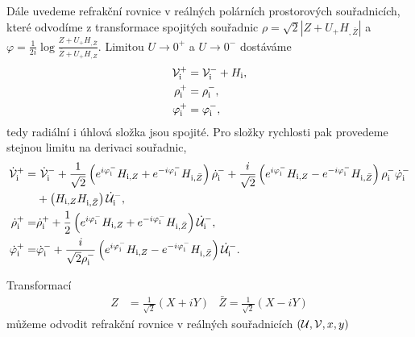 Dále uvedeme refrakční rovnice v reálných polárních prostorových souřadnicích, které odvodíme z transformace spojitých souřadnic
$\rho = \sqrt{2} \left|Z + U_{+} H_{,\bar{Z}}\right|$ a $\varphi = \frac{1}{2i} \log \frac{Z + U_+ H_{,\bar{Z}}}{\bar{Z} + U_+ H_{,Z}}$.
Limitou $U \to 0^+$ a $U \to 0^-$ dostáváme
\begin{equation}
    \begin{split}
        \mathcal{V}^{+}_{\mathrm{i}} &= \mathcal{V}^{-}_{\mathrm{i}} + H_{\mathrm{i}},\\
        \rho^{+}_{\mathrm{i}} &= \rho^{-}_{\mathrm{i}},\\
        \varphi^{+}_{\mathrm{i}} &= \varphi^{-}_{\mathrm{i}},
    \end{split}
\end{equation}
tedy radiální i úhlová složka jsou spojité. Pro složky rychlosti pak provedeme stejnou limitu na derivaci souřadnic,
\begin{equation}
    \begin{split}
        \dot{\mathcal{V}}_{\mathrm{i}}^{+}=& ~\dot{\mathcal{V}}_{\mathrm{i}}^{-}+\frac{1}{\sqrt{2}}\left(e^{i \varphi_{\mathrm{i}}^{-}} H_{\mathrm{i}, Z}+e^{-i \varphi_{\mathrm{i}}^{-}} H_{\mathrm{i}, \bar{Z}}\right) \dot{\rho}_{\mathrm{i}}^{-}+\frac{i}{\sqrt{2}}\left(e^{i \varphi_{\mathrm{i}}^{-}} H_{\mathrm{i}, Z}-e^{-i \varphi_{\mathrm{i}}^{-}} H_{\mathrm{i}, \bar{Z}}\right) \rho_{\mathrm{i}}^{-} \dot{\varphi}_{\mathrm{i}}^{-} \\
        &+\left(H_{\mathrm{i}, Z} H_{\mathrm{i}, \bar{Z}}\right) \dot{\mathcal{U}}_{\mathrm{i}}^{-}, \\
        \dot{\rho}_{\mathrm{i}}^{+}=& \dot{\rho}_{\mathrm{i}}^{+} + \frac{1}{2} \left(e^{i \varphi^-_\mathrm{i}} H_{\mathrm{i},Z} + e^{-i \varphi^-_\mathrm{i}} H_{\mathrm{i},\bar{Z}}\right)\dot{\mathcal{U}}_\mathrm{i}^{-},\\
        \dot{\varphi}_{\mathrm{i}}^{+}=&\dot{\varphi}_{\mathrm{i}}^{-} + \frac{i}{\sqrt{2}\rho_{\mathrm{i}}^{-}} \left(e^{i \varphi_{\mathrm{i}}^{-}} H_{\mathrm{i}, Z} - e^{-i \varphi_{\mathrm{i}}^{-}} H_{\mathrm{i}, \bar{Z}}\right) \dot{\mathcal{U}}_{\mathrm{i}}^{-}.
        \end{split}
\end{equation}

Transformací
\begin{align}
    Z &= \frac{1}{\sqrt{2}}\left(X + i Y\right) & \bar{Z} = \frac{1}{\sqrt{2}}\left(X - i Y\right)
\end{align}
můžeme odvodit refrakční rovnice v reálných souřadnicích $(\mathcal{U}, \mathcal{V}, x, y)$

